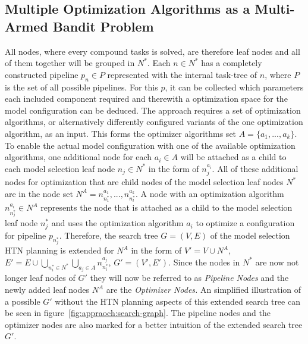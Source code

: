 \subsection{Multiple Optimization Algorithms as a Multi-Armed Bandit Problem}
\label{sec:appraoch:selection:bandit}
All nodes, where every compound tasks is solved, are therefore leaf nodes and all of them together will be grouped in $N^*$.
Each $n \in N^*$ has a completely constructed pipeline $p_n \in P$ represented with the internal task-tree of $n$, where $P$ is the set of all possible pipelines.
For this $p$, it can be collected which parameters each included component required and therewith a optimization space for the model configuration can be deduced.\newline
The approach requires a set of optimization algorithms, or alternatively differently configured variants of the one optimization algorithm, as an input.
This forms the optimizer algorithms set  $A = \{ a_1, ..., a_k \}$.
To enable the actual model configuration with one of the available optimization algorithms, one additional node for each $a_i \in A$ will be attached as a child to each model selection leaf node $n_j \in N^*$ in the form of $n_j^{a_i}$.
All of these additional nodes for optimization that are child nodes of the model selection leaf nodes $N^*$ are in the node set $N^A = {n^{a_1}_{n^*_1}, ... , n^{a_k}_{n^*_l}}$.
A node with an optimization algorithm $n^{a_i}_{n^*_j} \in N^A$ represents the node that is attached as a child to the model selection leaf node $n^*_j$ and uses the optimization algorithm $a_i$ to optimize a configuration for pipeline $p_{n^*_j}$.\newline
Therefore, the search tree $G=(V, E)$ of the model selection HTN planning is extended for $N^A$ in the form of $V'=V \cup N^A$, $E'=E \cup \bigcup_{n^*_i \in N^*} \bigcup_{a_j \in A} n^{a_j}_{n^*_i}$, $G' = (V', E')$.
Since the nodes in $N^*$ are now not longer leaf nodes of $G'$ they will now be referred to as \textit{Pipeline Nodes} and the newly added leaf nodes $N^A$ are the \textit{Optimizer Nodes.}
An simplified illustration of a possible $G'$ without the HTN planning aspects of this extended search tree can be seen in figure~\ref{fig:appraoch:search-graph}.
The pipeline nodes and the optimizer nodes are also marked for a better intuition of the extended search tree $G'$.
